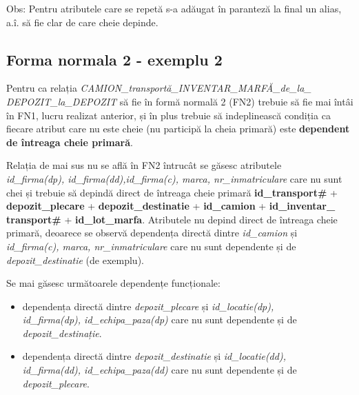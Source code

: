 \documentclass[12pt, a4paper]{article}
\begin{document}
Obs: Pentru atributele care se repetă s-a adăugat în paranteză la final un alias, a.î. să fie clar de care cheie depinde.

\subsection*{Forma normala 2 - exemplu 2}
Pentru ca relația \emph{CAMION\_transportă\_INVENTAR\_MARFĂ\_de\_la\_\\DEPOZIT\_la\_DEPOZIT} să fie în formă normală 2 (FN2) trebuie să fie mai întâi în FN1, lucru realizat anterior, și în plus trebuie să indeplinească condiția ca fiecare atribut care nu este cheie (nu participă la cheia primară) este \textbf{dependent de întreaga cheie primară}.

Relația de mai sus nu se află în FN2 întrucât se găsesc atributele \\\emph{id\_firma(dp), id\_firma(dd),id\_firma(c), marca, nr\_inmatriculare} care nu sunt chei și trebuie să depindă direct de întreaga cheie primară \textbf{id\_transport\#} + \textbf{depozit\_plecare} + \textbf{depozit\_destinatie} + \textbf{id\_camion} + \textbf{id\_inventar\_\\transport\#} + \textbf{id\_lot\_marfa}.
Atributele nu depind direct de întreaga cheie primară, deoarece se observă dependența directă dintre \emph{id\_camion} și \\\emph{id\_firma(c), marca, nr\_inmatriculare} care nu sunt dependente și de \\\emph{depozit\_destinatie} (de exemplu).

Se mai găsesc următoarele dependențe funcționale:
\begin{itemize}
    \item dependența directă dintre \emph{depozit\_plecare} și \emph{id\_locatie(dp), \\id\_firma(dp), id\_echipa\_paza(dp)} care nu sunt dependente și de \\\emph{depozit\_destinație}.
    \item dependența directă dintre \emph{depozit\_destinatie} și \emph{id\_locatie(dd), \\id\_firma(dd), id\_echipa\_paza(dd)} care nu sunt dependente și de \\\emph{depozit\_plecare}.
\end{itemize}
\end{document}
